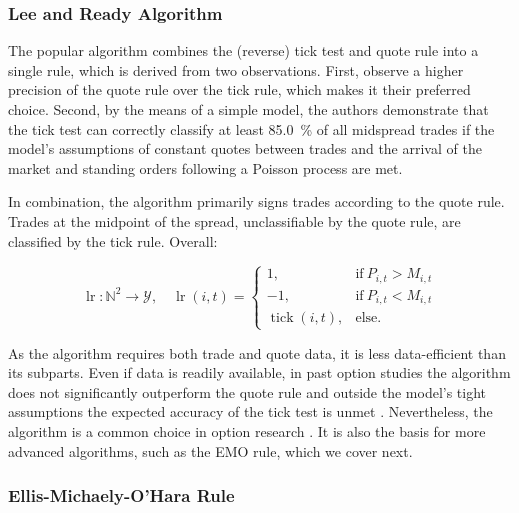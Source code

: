 \subsubsection{Lee and Ready Algorithm}\label{sec:lee-and-ready-algorithm}

The popular  algorithm \autocite[][745]{leeInferringTradeDirection1991} combines the (reverse) tick test and quote rule into a single rule, which is derived from two observations. First, \textcite[][735--743]{leeInferringTradeDirection1991} observe a higher precision of the quote rule over the tick rule, which makes it their preferred choice. Second, by the means of a simple model, the authors demonstrate that the tick test can correctly classify at least \SI{85.0}{\percent} of all midspread trades if the model's assumptions of constant quotes between trades and the arrival of the market and standing orders following a Poisson process are met.

In combination, the algorithm primarily signs trades according to the quote rule. Trades at the midpoint of the spread, unclassifiable by the quote rule, are classified by the tick rule. Overall:

\begin{equation}
    \operatorname{lr} \colon \mathbb{N}^2 \to \mathcal{Y},\quad\operatorname{lr}(i,t)=
    \begin{cases}
        1,                         & \text{if}\ P_{i, t} > M_{i, t} \\
        -1,                        & \text{if}\ P_{i, t} < M_{i, t} \\
        \operatorname{tick}(i, t), & \text{else}.
    \end{cases}
\end{equation}

As the algorithm requires both trade and quote data, it is less data-efficient than its subparts. Even if data is readily available, in past option studies the algorithm does not significantly outperform the quote rule and outside the model's tight assumptions the expected accuracy of the tick test is unmet \autocites[][30--32]{grauerOptionTradeClassification2022}[][886]{savickasInferringDirectionOption2003}. Nevertheless, the algorithm is a common choice in option research \autocite[cp.][453]{easleyOptionVolumeStock1998}. It is also the basis for more advanced algorithms, such as the \gls{EMO} rule, which we cover next.

\subsubsection{Ellis-Michaely-O'Hara
    Rule}\label{sec:ellis-michaely-ohara-rule}

